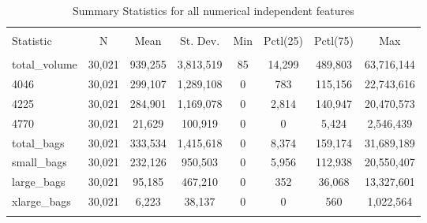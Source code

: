 \documentclass[11pt]{article}\usepackage[]{graphicx}\usepackage[]{color}
\begin{document}
\begin{center}

\begin{table}[H] \centering 
  \caption{Summary Statistics for all numerical independent features} 
  \label{desc_stat_ind} 
\begin{tabular}{@{\extracolsep{5pt}}lccccccc} 
\\[-1.8ex]\hline 
\hline \\[-1.8ex] 
Statistic & \multicolumn{1}{c}{N} & \multicolumn{1}{c}{Mean} & \multicolumn{1}{c}{St. Dev.} & \multicolumn{1}{c}{Min} & \multicolumn{1}{c}{Pctl(25)} & \multicolumn{1}{c}{Pctl(75)} & \multicolumn{1}{c}{Max} \\ 
\hline \\[-1.8ex] 
total\_volume & 30,021 & 939,255 & 3,813,519 & 85 & 14,299 & 489,803 & 63,716,144 \\ 
4046 & 30,021 & 299,107 & 1,289,108 & 0 & 783 & 115,156 & 22,743,616 \\ 
4225 & 30,021 & 284,901 & 1,169,078 & 0 & 2,814 & 140,947 & 20,470,573 \\ 
4770 & 30,021 & 21,629 & 100,919 & 0 & 0 & 5,424 & 2,546,439 \\ 
total\_bags & 30,021 & 333,534 & 1,415,618 & 0 & 8,374 & 159,174 & 31,689,189 \\ 
small\_bags & 30,021 & 232,126 & 950,503 & 0 & 5,956 & 112,938 & 20,550,407 \\ 
large\_bags & 30,021 & 95,185 & 467,210 & 0 & 352 & 36,068 & 13,327,601 \\ 
xlarge\_bags & 30,021 & 6,223 & 38,137 & 0 & 0 & 560 & 1,022,564 \\ 
\hline \\[-1.8ex] 
\end{tabular} 
\end{table} 

\end{center}
\end{document}
